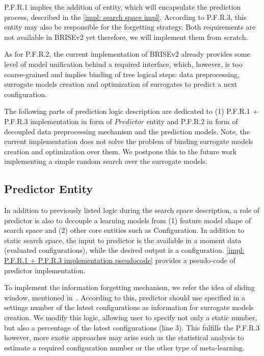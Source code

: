 P.F.R.1 implies the addition of entity, which will encapsulate the prediction process, described in the \cref{impl: search space impl}. According to P.F.R.3, this entity may also be responsible for the forgetting strategy. Both requirements are not available in BRISEv2 yet therefore, we will implement them from scratch.

As for P.F.R.2, the current implementation of BRISEv2 already provides some level of model unification behind a required interface, which, however, is too coarse-grained and implies binding of tree logical steps: data preprocessing, surrogate models creation and optimization of surrogates to predict a next configuration.

The following parts of prediction logic description are dedicated to (1) P.F.R.1 + P.F.R.3 implementation in form of $Predictor$ entity and P.F.R.2 in form of decoupled data preprocessing mechanism and the prediction models. Note, the current implementation does not solve the problem of binding surrogate models creation and optimization over them. We postpone this to the future work implementing a simple random search over the surrogate models.

\subsection{Predictor Entity}
In addition to previously listed logic during the search space description, a role of predictor is also to decouple a learning models from (1) feature model shape of search space and (2) other core entities such as Configuration. In addition to static search space, the input to predictor is the available in a moment data (evaluated configurations), while the desired output is a configuration. \cref{impl: P.F.R.1 + P.F.R.3 implementation pseudocode} provides a pseudo-code of predictor implementation.

To implement the information forgetting mechanism, we refer the idea of sliding window, mentioned in~\cite{ferreira2017multi}. According to this, predictor should use specified in a settings number of the latest configurations as information for surrogate models creation. We modify this logic, allowing user to specify not only a static number, but also a percentage of the latest configurations (line 3). This fulfills the P.F.R.3 however, more exotic approaches may arise such as the statistical analysis to estimate a required configuration number or the other type of meta-learning.

